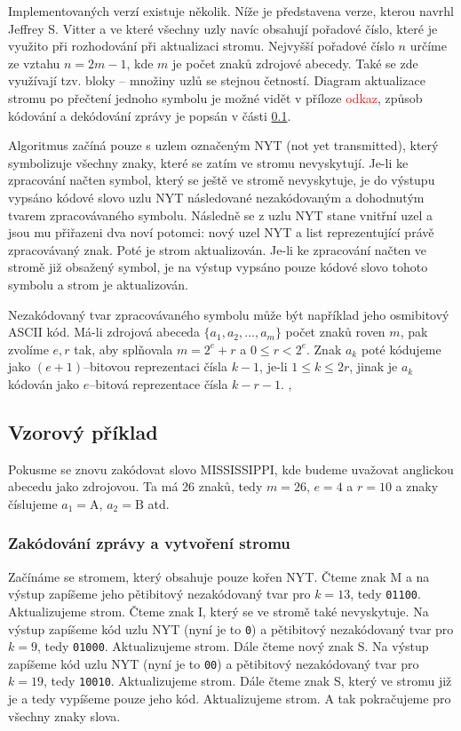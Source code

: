 Implementovaných verzí existuje několik. Níže je představena verze, kterou navrhl Jeffrey S. Vitter a ve které všechny uzly navíc obsahují pořadové číslo, které je využito při rozhodování při aktualizaci stromu. Nejvyšší pořadové číslo $n$ určíme ze vztahu $n = 2m -1$, kde $m$ je počet znaků zdrojové abecedy. Také se zde využívají tzv. bloky -- množiny uzlů se stejnou četností. Diagram aktualizace stromu po přečtení jednoho symbolu je možné vidět v příloze \textcolor{red}{odkaz}, způsob kódování a dekódování zprávy je popsán v části \ref{prikladAdaptivniHuffman}.

Algoritmus začíná pouze s uzlem označeným NYT (not yet transmitted), který symbolizuje všechny znaky, které se zatím ve stromu nevyskytují. Je-li ke zpracování načten symbol, který se ještě ve stromě nevyskytuje, je do výstupu vypsáno kódové slovo uzlu NYT následované nezakódovaným a dohodnutým tvarem zpracovávaného symbolu. Následně se z uzlu NYT stane vnitřní uzel a jsou mu přiřazeni dva noví potomci: nový uzel NYT a list reprezentující právě zpracovávaný znak. Poté je strom aktualizován. Je-li ke zpracování načten ve stromě již obsažený symbol, je na výstup vypsáno pouze kódové slovo tohoto symbolu a strom je aktualizován.

Nezakódovaný tvar zpracovávaného symbolu může být například jeho osmibitový ASCII kód. Má-li zdrojová abeceda $\{a_1, a_2, \ldots, a_m\}$ počet znaků roven $m$, pak zvolíme $e,r$ tak, aby splňovala $m= 2^e + r$ a $0 \leq r < 2^e$. Znak $a_k$ poté kódujeme jako $(e+1)$--bitovou reprezentaci čísla $k-1$, je-li $1 \leq k \leq 2r$, jinak je $a_k$ kódován jako $e$--bitová reprezentace čísla $k-r-1$. \cite{dataCompression}, \cite{introductionToDataCompression}

\subsection{Vzorový příklad}
\label{prikladAdaptivniHuffman}
Pokusme se znovu zakódovat slovo MISSISSIPPI, kde budeme uvažovat anglickou abecedu jako zdrojovou. Ta má 26 znaků, tedy $m=26$, $e = 4$ a $r=10$ a znaky číslujeme $a_1 = \mathrm{A}$, $a_2 = \mathrm{B}$ atd.

\subsubsection{Zakódování zprávy a vytvoření stromu}
Začínáme se stromem, který obsahuje pouze kořen NYT. Čteme znak M a na výstup zapíšeme jeho pětibitový nezakódovaný tvar pro $k=13$, tedy \texttt{01100}. Aktualizujeme strom. Čteme znak I, který se ve stromě také nevyskytuje. Na výstup zapíšeme kód uzlu NYT (nyní je to \texttt{0}) a pětibitový nezakódovaný tvar pro $k=9$, tedy \texttt{01000}. Aktualizujeme strom. Dále čteme nový znak S. Na výstup zapíšeme kód uzlu NYT (nyní je to \texttt{00}) a pětibitový nezakódovaný tvar pro $k=19$, tedy \texttt{10010}. Aktualizujeme strom. Dále čteme znak S, který ve stromu již je a tedy vypíšeme pouze jeho kód. Aktualizujeme strom. A tak pokračujeme pro všechny znaky slova.

